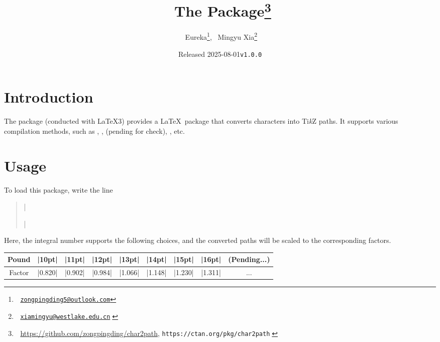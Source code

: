 \documentclass{l3doc}
\title{^^A
  The \pkg{char2path} Package\thanks{^^A
    \url{https://github.com/zongpingding/char2path},
    \texttt{https://ctan.org/pkg/char2path}^^A
  }^^A
}
\author{^^A
  Eureka\thanks{^^A
    \href{mailto:zongpingding5@outlook.com}{\texttt{zongpingding5@outlook.com}}},~
  Mingyu Xia\thanks{^^A
    \href{mailto:xiamingyu@westlake.edu.cn}{\texttt{xiamingyu@westlake.edu.cn}}^^A
  }^^A
}
\date{Released 2025-08-01\quad \texttt{v1.0.0}}
\begin{document}
\maketitle

\begin{documentation}

\section{Introduction}

The  package (conducted with \LaTeX3) provides
a \LaTeX\ package that converts characters into Ti\textit k\/Z paths.
It supports various compilation methods, such as ,
,  (pending for check), , etc.

\section{Usage}

To load this package, write the line
\begin{quote}
  |\usepackage[scale = ||pt]{char2path}|
\end{quote}

Here, the integral number  supports the following choices,
and the converted paths will be scaled to the corresponding factors.

\begin{center}
  \begin{tabular}{*9c}
    \toprule
    Pound   & |10pt|  & |11pt|  & |12pt|  &
    |13pt|  & |14pt|  & |15pt|  & |16pt|  & (Pending...)\\
    \midrule
    Factor  & |0.820| & |0.902| & |0.984| &
    |1.066| & |1.148| & |1.230| & |1.311| & ...\\
    \bottomrule
  \end{tabular}
\end{center}


\end{documentation}
\end{document}
